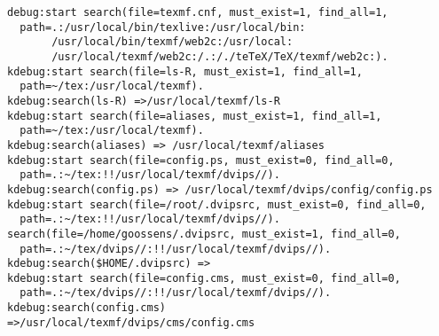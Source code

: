 \begin{BVerbatim}[fontsize=\small]
debug:start search(file=texmf.cnf, must_exist=1, find_all=1,
  path=.:/usr/local/bin/texlive:/usr/local/bin:
       /usr/local/bin/texmf/web2c:/usr/local:
       /usr/local/texmf/web2c:/.:/./teTeX/TeX/texmf/web2c:).
kdebug:start search(file=ls-R, must_exist=1, find_all=1,
  path=~/tex:/usr/local/texmf).
kdebug:search(ls-R) =>/usr/local/texmf/ls-R
kdebug:start search(file=aliases, must_exist=1, find_all=1,
  path=~/tex:/usr/local/texmf).
kdebug:search(aliases) => /usr/local/texmf/aliases
kdebug:start search(file=config.ps, must_exist=0, find_all=0,
  path=.:~/tex:!!/usr/local/texmf/dvips//).
kdebug:search(config.ps) => /usr/local/texmf/dvips/config/config.ps
kdebug:start search(file=/root/.dvipsrc, must_exist=0, find_all=0,
  path=.:~/tex:!!/usr/local/texmf/dvips//).
search(file=/home/goossens/.dvipsrc, must_exist=1, find_all=0,
  path=.:~/tex/dvips//:!!/usr/local/texmf/dvips//).
kdebug:search($HOME/.dvipsrc) =>
kdebug:start search(file=config.cms, must_exist=0, find_all=0,
  path=.:~/tex/dvips//:!!/usr/local/texmf/dvips//).
kdebug:search(config.cms)
=>/usr/local/texmf/dvips/cms/config.cms
\end{BVerbatim}
